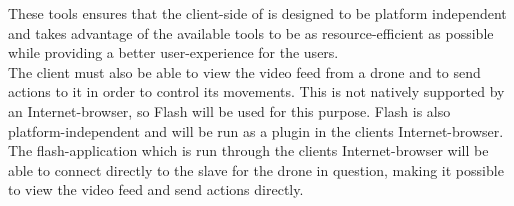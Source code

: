 These tools ensures that the client-side of \projectname{} is designed to be platform independent and takes advantage of the available tools to be as resource-efficient as possible while providing a better user-experience for the users. \\

The client must also be able to view the video feed from a drone and to send actions to it in order to control its movements. 
This is not natively supported by an Internet-browser, so Flash will be used for this purpose. 
Flash is also platform-independent and will be run as a plugin in the clients Internet-browser.
The flash-application which is run through the clients Internet-browser will be able to connect directly to the slave for the drone in question, making it possible to view the video feed and send actions directly.

